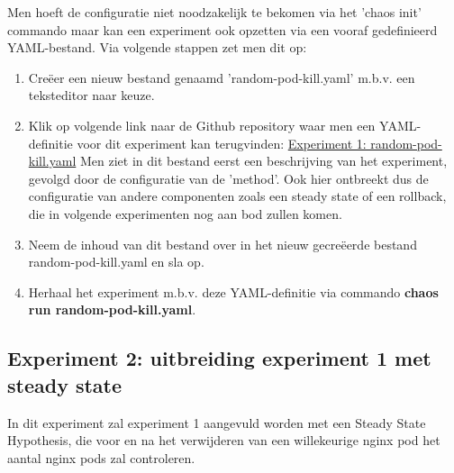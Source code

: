 Men hoeft de configuratie niet noodzakelijk te bekomen via het 'chaos init' commando maar kan een experiment ook opzetten via een vooraf gedefinieerd YAML-bestand. Via volgende stappen zet men dit op: 
\begin{enumerate} 
    \item Creëer een nieuw bestand genaamd 'random-pod-kill.yaml' m.b.v. een teksteditor naar keuze. 
    \item Klik op volgende link naar de Github repository waar men een YAML-definitie voor dit experiment kan terugvinden: \href{https://github.com/KenBruggeman/BP\textunderscore 21-22/blob/master/bachelorproef/docs/chaostoolkit%20experimenten/random-pod-kill.yaml}{Experiment 1: random-pod-kill.yaml}
    \newline Men ziet in dit bestand eerst een beschrijving van het experiment, gevolgd door de configuratie van de 'method'. Ook hier ontbreekt dus de configuratie van andere componenten zoals een steady state of een rollback, die in volgende experimenten nog aan bod zullen komen.
    \item Neem de inhoud van dit bestand over in het nieuw gecreëerde bestand random-pod-kill.yaml en sla op.
    \item Herhaal het experiment m.b.v. deze YAML-definitie via commando {\bf chaos run random-pod-kill.yaml}.
\end{enumerate}

\subsection{Experiment 2: uitbreiding experiment 1 met steady state}

In dit experiment zal experiment 1 aangevuld worden met een Steady State Hypothesis, die voor en na het verwijderen van een willekeurige nginx pod het aantal nginx pods zal controleren.

